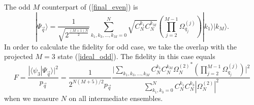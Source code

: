 \documentclass{WileyMSP-template}
\begin{document}
{The odd $ M $ counterpart of (\ref{final_even}) is
%
\begin{equation}
\label{final_odd}
| \Psi_{\vec{q}} \rangle=\frac{1}{\sqrt{2^{\frac{(M+1)N}{2}}}}\sum_{k_1,k_3,\ldots,k_M=0}^{N} \sqrt{ C^{k_1}_{N}  C^{k_M}_{N} }
  \left( \prod_{j=2}^{M-1} \Omega_{q_j}^{(j)} \right) |k_1\rangle|k_M\rangle .
\end{equation}
%
In order to calculate the fidelity for odd case, we take the overlap with the projected $ M = 3 $ state (\ref{ideal_odd}). The fidelity in this case equals
%
\begin{equation}
\label{fidelity_odd}
F = \frac{| \langle  \psi_3 | \Psi_{\vec{q}} \rangle |^2}{p_{\vec{q}} }   =\frac{1}{2^{N(M+5)/2} p_{\vec{q}} }\frac{\Big|\sum_{k_1, k_3, \dots, k_M }
 C_N^{k_1}C_N^{k_M} {\Omega_{N}^{(2)}}^* \left( \prod_{j=2}^{M-1} \Omega_{q_j}^{(j)} \right)   \Big|^2 }{ \sum_{k_1,k_3=0}^{N}  C^{k_1}_{N}  C^{k_3}_{N} | \Omega_{N}^{(2)} |^2 }
\end{equation}
%
when we measure $N$ on all  intermediate ensembles.








%

}
\end{document}
